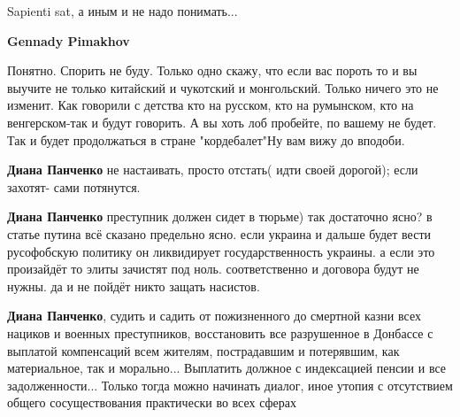 \begin{itemize}
\begin{itemize}
Sapienti sat, а иным и не надо понимать...

 
\textbf{Gennady Pimakhov} 

Понятно. Спорить не буду. Только одно скажу, что если
вас пороть то и вы выучите не только китайский и чукотский и монгольский. Только
ничего это не изменит. Как говорили с детства кто на русском, кто на
румынском, кто на венгерском-так и будут говорить. А вы хоть лоб пробейте, по
вашему не будет. Так и будет продолжаться в стране "кордебалет"Ну вам вижу до
вподоби.


 
\textbf{Диана Панченко} не настаивать, просто отстать( идти своей дорогой); если захотят- сами потянутся.

 
\textbf{Диана Панченко} преступник должен сидет в тюрьме) так достаточно ясно?
в статье путина всё сказано предельно ясно. если украина и дальше будет вести
русофобскую политику он ликвидирует государственность украины. а если это
произайдёт то элиты зачистят под ноль. соответственно и договора будут не
нужны. да и не пойдёт никто защать насистов.

 
\textbf{Диана Панченко}, судить и садить от пожизненного до смертной казни всех
нациков и военных преступников, восстановить все разрушенное в Донбассе с
выплатой компенсаций всем жителям, пострадавшим и потерявшим, как материальное,
так и морально... Выплатить должное с индексацией пенсии и все задолженности...
Только тогда можно начинать диалог, иное утопия с отсутствием общего
сосуществования практически во всех сферах


\end{itemize}
\end{itemize}
